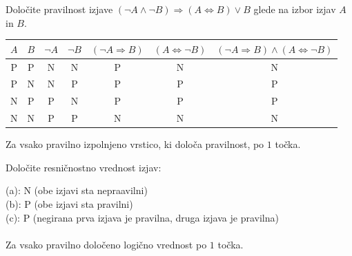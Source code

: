 \documentclass[addpoints]{exam}
\begin{document}
\begin{questions}

    
    \question[4]
    Določite pravilnost izjave $(\lnot A \land  \lnot B)\Rightarrow (A\Leftrightarrow  B) \lor B$ glede na izbor izjav $A$ in $B$.

    \begin{solution}[11cm]
        \begin{table}[H]
            \begin{tabular}{ccccccc}
             $A$ & $B$ & $\lnot A$ & $\lnot B$ & $(\lnot A\Rightarrow B)$ & $(A\Leftrightarrow \lnot B)$ & $(\lnot A\Rightarrow B)\land(A\Leftrightarrow \lnot B)$\\ \hline
             P & P & N & N & P & N & N \\ 
             P & N & N & P & P & P & P \\
             N & P & P & N & P & P & P \\
             N & N & P & P & N & N & N
            \end{tabular}
        \end{table}
        Za vsako pravilno izpolnjeno vrstico, ki določa pravilnost, po $1$ točka.
    \end{solution}




    \question[3]
    Določite resničnostno vrednost izjav:

    \begin{solution}
        (a): N (obe izjavi sta nepraavilni) \\
        (b): P (obe izjavi sta pravilni) \\
        (c): P (negirana prva izjava je pravilna, druga izjava je pravilna) \\ \\
        Za vsako pravilno določeno logično vrednost po $1$ točka.
    \end{solution}




\end{questions}
\end{document}
